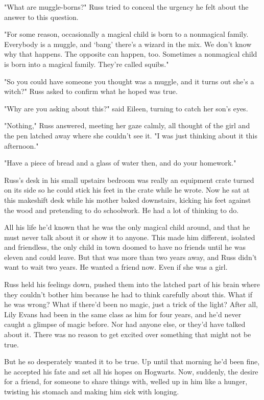 "What are muggle-borns?" Russ tried to conceal the urgency he felt about the answer to this question.

"For some reason, occasionally a magical child is born to a nonmagical family. Everybody is a muggle, and `bang' there's a wizard in the mix. We don't know why that happens. The opposite can happen, too. Sometimes a nonmagical child is born into a magical family. They're called squibs."

"So you could have someone you thought was a muggle, and it turns out she's a witch?" Russ asked to confirm what he hoped was true.

"Why are you asking about this?" said Eileen, turning to catch her son's eyes.

"Nothing," Russ answered, meeting her gaze calmly, all thought of the girl and the pen latched away where she couldn't see it. "I was just thinking about it this afternoon."

"Have a piece of bread and a glass of water then, and do your homework."

Russ's desk in his small upstairs bedroom was really an equipment crate turned on its side so he could stick his feet in the crate while he wrote. Now he sat at this makeshift desk while his mother baked downstairs, kicking his feet against the wood and pretending to do schoolwork. He had a lot of thinking to do.

All his life he'd known that he was the only magical child around, and that he must never talk about it or show it to anyone. This made him different, isolated and friendless, the only child in town doomed to have no friends until he was eleven and could leave. But that was more than two years away, and Russ didn't want to wait two years. He wanted a friend now. Even if she was a girl.

Russ held his feelings down, pushed them into the latched part of his brain where they couldn't bother him because he had to think carefully about this. What if he was wrong? What if there'd been no magic, just a trick of the light? After all, Lily Evans had been in the same class as him for four years, and he'd never caught a glimpse of magic before. Nor had anyone else, or they'd have talked about it. There was no reason to get excited over something that might not be true.

But he so desperately wanted it to be true. Up until that morning he'd been fine, he accepted his fate and set all his hopes on Hogwarts. Now, suddenly, the desire for a friend, for someone to share things with, welled up in him like a hunger, twisting his stomach and making him sick with longing.

